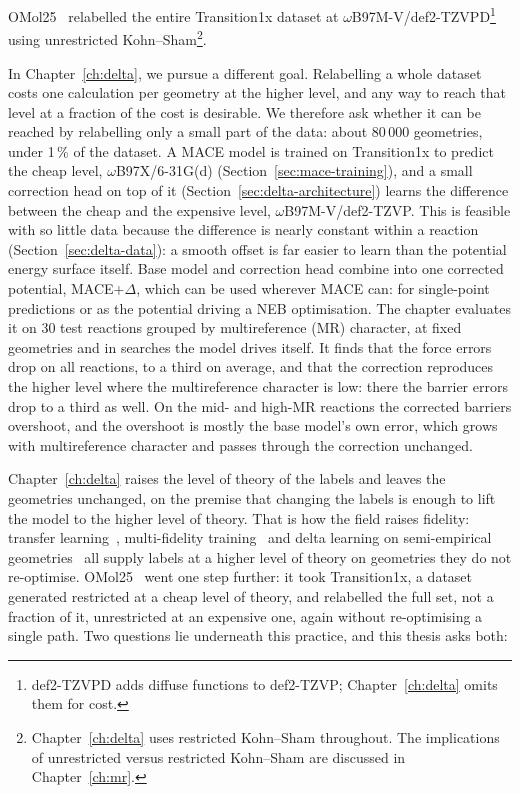 OMol25~\cite{omol25} relabelled the entire Transition1x dataset at
\mbox{$\omega$B97M-V/def2-TZVPD}\footnote{def2-TZVPD adds diffuse
functions to def2-TZVP; Chapter~\ref{ch:delta} omits them for cost.} using
unrestricted Kohn--Sham\footnote{Chapter~\ref{ch:delta} uses restricted
Kohn--Sham throughout. The implications of unrestricted versus
restricted Kohn--Sham are discussed in Chapter~\ref{ch:mr}.}.

In Chapter~\ref{ch:delta}, we pursue a different goal. Relabelling a
whole dataset costs one calculation per geometry at the higher level,
and any way to reach that level at a fraction of the cost is
desirable. We therefore ask whether it can be reached by relabelling
only a small part of the data: about 80\,000 geometries, under 1\,\%
of the dataset. A MACE model is trained on Transition1x to predict the cheap level,
\mbox{$\omega$B97X/6-31G(d)} (Section~\ref{sec:mace-training}), and
a small correction head on top of it
(Section~\ref{sec:delta-architecture}) learns the difference between
the cheap and the expensive level, \mbox{$\omega$B97M-V/def2-TZVP}. This is feasible with so little data because
the difference is nearly constant within a reaction
(Section~\ref{sec:delta-data}): a smooth offset is far easier to learn
than the potential energy surface itself. Base model and correction
head combine into one corrected potential, MACE+$\Delta$, which can be
used wherever MACE can: for single-point predictions or as the
potential driving a NEB optimisation. The chapter evaluates it on 30
test reactions grouped by multireference (MR) character, at fixed
geometries and in searches the model drives itself. It finds that the force errors drop on all reactions, to a third on average, and
that the correction reproduces the higher level where the
multireference character is low: there the barrier errors drop to a
third as well. On the mid- and high-MR reactions the corrected
barriers overshoot, and the overshoot is mostly the base model's own
error, which grows with multireference character and passes through
the correction unchanged.


Chapter~\ref{ch:delta} raises the level of theory of the labels and
leaves the geometries unchanged, on the premise that changing the labels is
enough to lift the model to the higher level of theory. That is how the field raises fidelity: transfer
learning~\cite{smith2019ani1ccx}, multi-fidelity
training~\cite{messerly2025} and delta learning on semi-empirical
geometries~\cite{ren2026} all
supply labels at a higher level of theory on geometries they do not
re-optimise. OMol25~\cite{omol25} went one step further: it took
Transition1x, a dataset generated restricted at a cheap level of
theory, and relabelled the full set, not a fraction of it,
unrestricted at an expensive one, again without re-optimising a single
path. Two questions lie underneath this
practice, and this thesis asks both:

